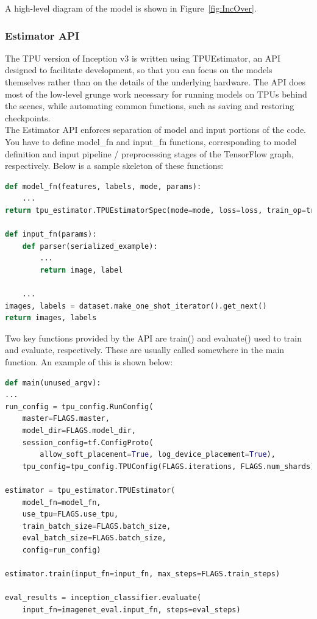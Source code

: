 \documentclass[14pt]{report}
\begin{document}
			A high-level diagram of the model is shown in Figure~\ref{fig:IncOver}.

			\subsubsection{Estimator API}
			The TPU version of Inception v3 is written using TPUEstimator, an API designed to facilitate development, so that you can focus on the models themselves rather than on the details of the underlying hardware. The API does most of the low-level grunge work necessary for running models on TPUs behind the scenes, while automating common functions, such as saving and restoring checkpoints.\\

			The Estimator API enforces separation of model and input portions of the code. You have to define model\_fn and input\_fn functions, corresponding to model definition and input pipeline / preprocessing stages of the TensorFlow graph, respectively. Below is a sample skeleton of these functions:\\
			\begin{lstlisting}[language=Python]
def model_fn(features, labels, mode, params):
	...
return tpu_estimator.TPUEstimatorSpec(mode=mode, loss=loss, train_op=train_op)

def input_fn(params):
	def parser(serialized_example):
		...
		return image, label

	...
images, labels = dataset.make_one_shot_iterator().get_next()
return images, labels
			\end{lstlisting}
			Two key functions provided by the API are train() and evaluate() used to train and evaluate, respectively. These are usually called somewhere in the main function. An example of this is shown below:\\
			\begin{lstlisting}[language=Python]
def main(unused_argv):
...
run_config = tpu_config.RunConfig(
	master=FLAGS.master,
	model_dir=FLAGS.model_dir,
	session_config=tf.ConfigProto(
		allow_soft_placement=True, log_device_placement=True),
	tpu_config=tpu_config.TPUConfig(FLAGS.iterations, FLAGS.num_shards),)
 
estimator = tpu_estimator.TPUEstimator(
	model_fn=model_fn,
	use_tpu=FLAGS.use_tpu,
	train_batch_size=FLAGS.batch_size,
	eval_batch_size=FLAGS.batch_size,
	config=run_config)
			  
estimator.train(input_fn=input_fn, max_steps=FLAGS.train_steps)
			  
eval_results = inception_classifier.evaluate(
	input_fn=imagenet_eval.input_fn, steps=eval_steps)
			\end{lstlisting}
\end{document}

